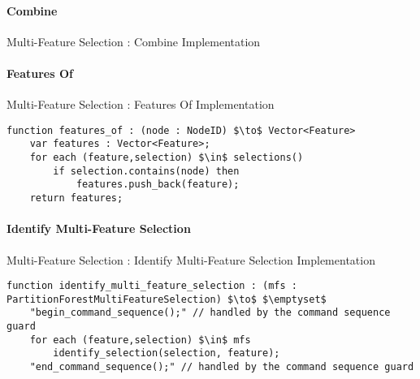 \paragraph{Combine}

\begin{stulisting}[H]
\caption{Multi-Feature Selection : Combine Implementation}

\end{stulisting}

\paragraph{Features Of}

\begin{stulisting}[H]
\caption{Multi-Feature Selection : Features Of Implementation}
\begin{lstlisting}[style=Default]
function features_of : (node : NodeID) $\to$ Vector<Feature>
	var features : Vector<Feature>;
	for each (feature,selection) $\in$ selections()
		if selection.contains(node) then
			features.push_back(feature);
	return features;
\end{lstlisting}
\end{stulisting}

\paragraph{Identify Multi-Feature Selection}

\begin{stulisting}[H]
\caption{Multi-Feature Selection : Identify Multi-Feature Selection Implementation}
\begin{lstlisting}[style=Default]
function identify_multi_feature_selection : (mfs : PartitionForestMultiFeatureSelection) $\to$ $\emptyset$
	"begin_command_sequence();" // handled by the command sequence guard
	for each (feature,selection) $\in$ mfs
		identify_selection(selection, feature);
	"end_command_sequence();" // handled by the command sequence guard
\end{lstlisting}
\end{stulisting}


